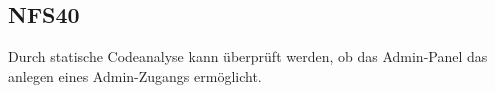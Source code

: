 \subsection*{NFS40}

Durch statische Codeanalyse kann überprüft werden, ob das Admin-Panel das anlegen eines Admin-Zugangs ermöglicht.